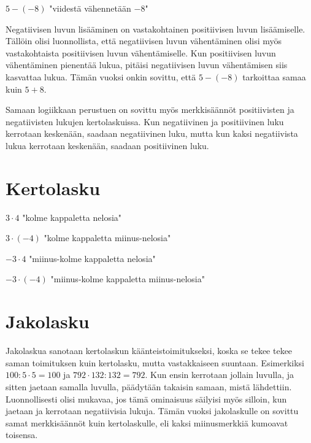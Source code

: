 
$5-(-8)$ "viidestä vähennetään $-8$"

Negatiivisen luvun lisääminen on vastakohtainen positiivisen luvun lisäämiselle. Tällöin olisi luonnollista, että negatiivisen luvun vähentäminen olisi myös vastakohtaista positiivisen luvun vähentämiselle. Kun positiivisen luvun vähentäminen pienentää lukua, pitäisi negatiivisen luvun vähentämisen siis kasvattaa lukua. Tämän vuoksi onkin sovittu, että $5-(-8)$ tarkoittaa samaa kuin $5+8$.


Samaan logiikkaan perustuen on sovittu myös merkkisäännöt positiivisten ja negatiivisten lukujen kertolaskuissa. Kun negatiivinen ja positiivinen luku kerrotaan keskenään, saadaan negatiivinen luku, mutta kun kaksi negatiivista lukua kerrotaan keskenään, saadaan positiivinen luku.

\section{Kertolasku}

$3 \cdot 4$ "kolme kappaletta nelosia"


$3 \cdot (-4)$ "kolme kappaletta miinus-nelosia"


$-3 \cdot 4$ "miinus-kolme kappaletta nelosia"


$-3 \cdot (-4)$ "miinus-kolme kappaletta miinus-nelosia"


\section{Jakolasku}

Jakolaskua sanotaan kertolaskun käänteistoimitukseksi, koska se tekee tekee saman toimituksen kuin kertolasku, mutta vastakkaiseen suuntaan. Esimerkiksi $100:5\cdot 5=100$ ja $792\cdot 132:132=792$. Kun ensin kerrotaan jollain luvulla, ja sitten jaetaan samalla luvulla, päädytään takaisin samaan, mistä lähdettiin. Luonnollisesti olisi mukavaa, jos tämä ominaisuus säilyisi myös silloin, kun jaetaan ja kerrotaan negatiivisia lukuja. Tämän vuoksi jakolaskulle on sovittu samat merkkisäännöt kuin kertolaskulle, eli kaksi miinusmerkkiä kumoavat toisensa.

